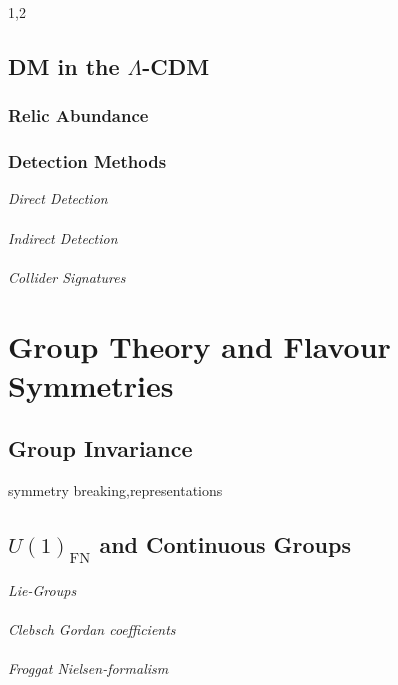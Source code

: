 \documentclass[11pt,a4paper,twoside]{article}
\numberwithin{equation}{section}
\begin{document}
\begin{spacing}{1,2}








\subsection{DM in the $\Lambda$-CDM}




\subsubsection{Relic Abundance}
\label{sec_RD}



\subsubsection{Detection Methods}
\textit{Direct Detection} \\
\\ \textit{Indirect Detection} \\
\\ \textit{Collider Signatures}

\section{Group Theory and Flavour Symmetries}
\subsection{Group Invariance}
symmetry breaking,representations
\subsection{$U(1)_\text{FN}$ and Continuous Groups}
\label{sec_FNGT}
 \textit{Lie-Groups}\\
\\ \textit{Clebsch Gordan coefficients} \\
\\ \textit{Froggat Nielsen-formalism}


\end{spacing}
\end{document}
